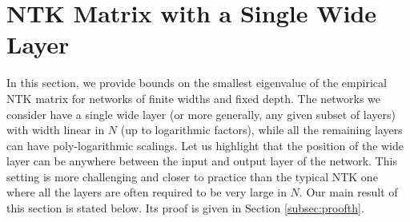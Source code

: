 \documentclass[11pt]{article}
\begin{document}
\section{NTK Matrix with a Single Wide Layer}\label{sec:NTK_finite}
In this section, we provide bounds on the smallest eigenvalue of the empirical NTK matrix for networks of finite widths and fixed depth.
The networks we consider have a single wide layer (or more generally, any given subset of layers) with width linear in $N$ (up to logarithmic factors),
while all the remaining layers can have poly-logarithmic scalings.
Let us highlight that the position of the wide layer can be anywhere 
between the input and output layer of the network.
This setting is more challenging and closer to practice than the typical NTK one
where all the layers are often required to be very large in $N$.
Our main result of this section is stated below. Its proof is given in Section \ref{subsec:proofth}.
\end{document}
